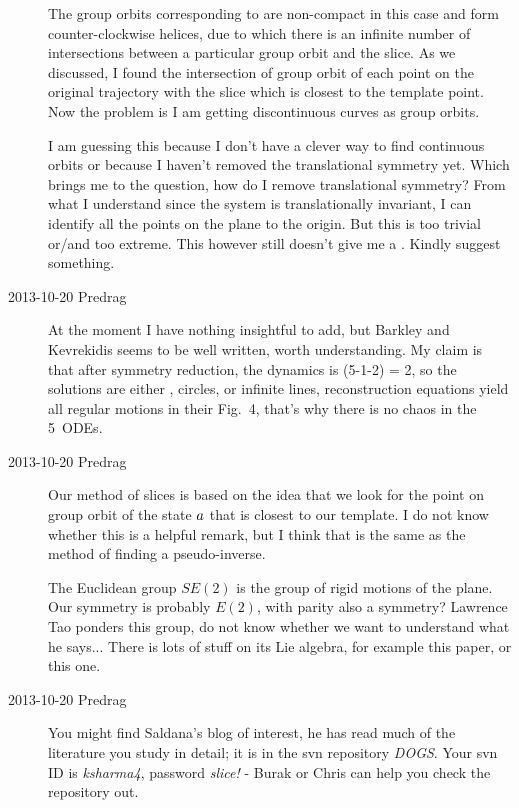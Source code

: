 \begin{description}
The group orbits corresponding to  are non-compact in this
case and form counter-clockwise helices, due to which there is an
infinite number of intersections between a particular group orbit and
the slice. As we discussed, I found the intersection of group orbit
of each point on the original trajectory with the slice which is
closest to the template point. Now the problem is I am getting
discontinuous curves as group orbits.



I am guessing this because I don't have a clever way to find
continuous orbits or because I haven't removed the translational
symmetry yet. Which brings me to the question, how do I remove
translational symmetry? From what I understand since the system is
translationally invariant, I can identify all the points on the plane
to the origin. But this is too trivial or/and too extreme. This
however still doesn't give me a \rpo.
Kindly suggest something.

\item[2013-10-20 Predrag] At the moment I have nothing insightful to add,
but Barkley and Kevrekidis seems to be well written, worth
understanding. My claim is that after symmetry reduction, the dynamics is
(5-1-2) = 2\dmn, so the solutions are either \eqva, circles, or infinite
lines, reconstruction equations yield all regular motions in
their Fig.~4, that's why there is no chaos in the 5\dmn\ ODEs.

\item[2013-10-20 Predrag] Our method of slices is based on the idea that
we look for the point on group orbit of the state $a$ that is closest
to our template. I do not know whether this is a helpful remark, but
I think that is the same as the method of finding a
{pseudo-inverse}.

The Euclidean group $SE(2)$ is the group of rigid motions of the plane.
Our symmetry is probably $E(2)$, with parity also a symmetry? Lawrence Tao
ponders
{this group}, do not know whether we want to understand what he says...
There is lots of stuff on its Lie algebra, for example
{this paper}, or
{this one}.

\item[2013-10-20 Predrag] You might find Saldana's blog of interest, he
has read much of the literature you study in detail; it is
in the svn repository \emph{DOGS}. Your svn ID is \emph{ksharma4},
password \emph{slice!} - Burak or Chris can help you check the repository
out.


\end{description}
